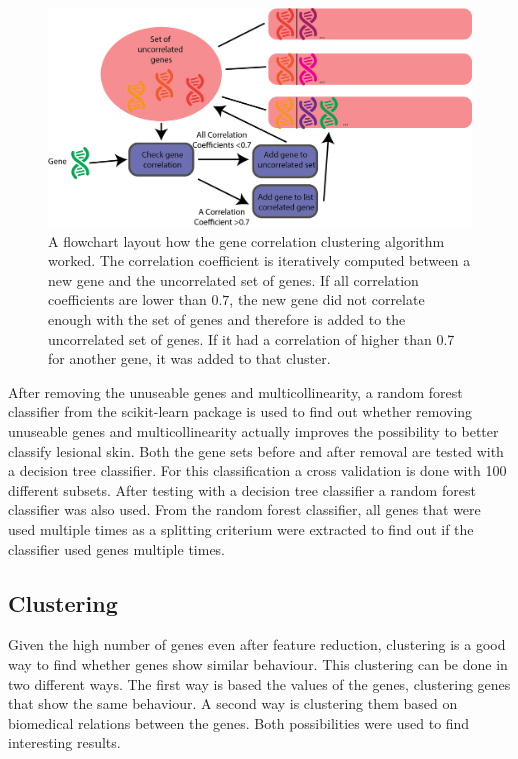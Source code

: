 \documentclass[10pt,a4paper]{article}
\begin{document}
	\begin{figure}
		\includegraphics[width=1\textwidth]{GreedyClustering.png}
		\caption{A flowchart layout how the gene correlation clustering algorithm worked. The correlation coefficient is iteratively computed between a new gene and the uncorrelated set of genes. If all correlation coefficients are lower than $0.7$, the new gene did not correlate enough with the set of genes and therefore is added to the uncorrelated set of genes. If it had a correlation of higher than 0.7 for another gene, it was added to that cluster.}
		\label{fig:GreedyCorrelationClustering}
	\end{figure}
	
	After removing the unuseable genes and multicollinearity, a random forest classifier from the scikit-learn package is used to find out whether removing unuseable genes and multicollinearity actually improves the possibility to better classify lesional skin. Both the gene sets before and after removal are tested with a decision tree classifier. For this classification a cross validation is done with 100 different subsets. After testing with a decision tree classifier a random forest classifier was also used. From the random forest classifier, all genes that were used multiple times as a splitting criterium were extracted to find out if the classifier used genes multiple times.
	
	\subsection{Clustering}
	\label{subsec:MethodsPositionalClustering}
	
	Given the high number of genes even after feature reduction, clustering is a good way to find whether genes show similar behaviour. This clustering can be done in two different ways. The first way is based the values of the genes, clustering genes that show the same behaviour. A second way is clustering them based on biomedical relations between the genes. Both possibilities were used to find interesting results.
	
\end{document}

